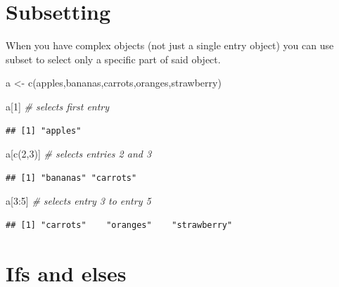 \documentclass[
]{book}
\newenvironment{Shaded}{\begin{snugshade}}{\end{snugshade}}
\newcommand{\CommentTok}[1]{\textcolor[rgb]{0.56,0.35,0.01}{\textit{#1}}}
\newcommand{\DecValTok}[1]{\textcolor[rgb]{0.00,0.00,0.81}{#1}}
\newcommand{\FunctionTok}[1]{\textcolor[rgb]{0.00,0.00,0.00}{#1}}
\newcommand{\NormalTok}[1]{#1}
\newcommand{\OtherTok}[1]{\textcolor[rgb]{0.56,0.35,0.01}{#1}}
\newcommand{\SpecialCharTok}[1]{\textcolor[rgb]{0.00,0.00,0.00}{#1}}
\newcommand{\StringTok}[1]{\textcolor[rgb]{0.31,0.60,0.02}{#1}}
\begin{document}
\hypertarget{subsetting}{%
\section{Subsetting}\label{subsetting}}

When you have complex objects (not just a single entry object) you can use subset to select only a specific part of said object.

\begin{Shaded}
\begin{Highlighting}[]
\NormalTok{a }\OtherTok{\textless{}{-}} \FunctionTok{c}\NormalTok{(}\StringTok{\textquotesingle{}apples\textquotesingle{}}\NormalTok{,}\StringTok{\textquotesingle{}bananas\textquotesingle{}}\NormalTok{,}\StringTok{\textquotesingle{}carrots\textquotesingle{}}\NormalTok{,}\StringTok{\textquotesingle{}oranges\textquotesingle{}}\NormalTok{,}\StringTok{\textquotesingle{}strawberry\textquotesingle{}}\NormalTok{)}

\NormalTok{a[}\DecValTok{1}\NormalTok{]   }\CommentTok{\# selects first entry}
\end{Highlighting}
\end{Shaded}

\begin{verbatim}
## [1] "apples"
\end{verbatim}

\begin{Shaded}
\begin{Highlighting}[]
\NormalTok{a[}\FunctionTok{c}\NormalTok{(}\DecValTok{2}\NormalTok{,}\DecValTok{3}\NormalTok{)]  }\CommentTok{\# selects entries 2 and 3}
\end{Highlighting}
\end{Shaded}

\begin{verbatim}
## [1] "bananas" "carrots"
\end{verbatim}

\begin{Shaded}
\begin{Highlighting}[]
\NormalTok{a[}\DecValTok{3}\SpecialCharTok{:}\DecValTok{5}\NormalTok{]  }\CommentTok{\# selects entry 3 to entry 5}
\end{Highlighting}
\end{Shaded}

\begin{verbatim}
## [1] "carrots"    "oranges"    "strawberry"
\end{verbatim}

\hypertarget{ifs-and-elses}{%
\section{Ifs and elses}\label{ifs-and-elses}}
\end{document}
